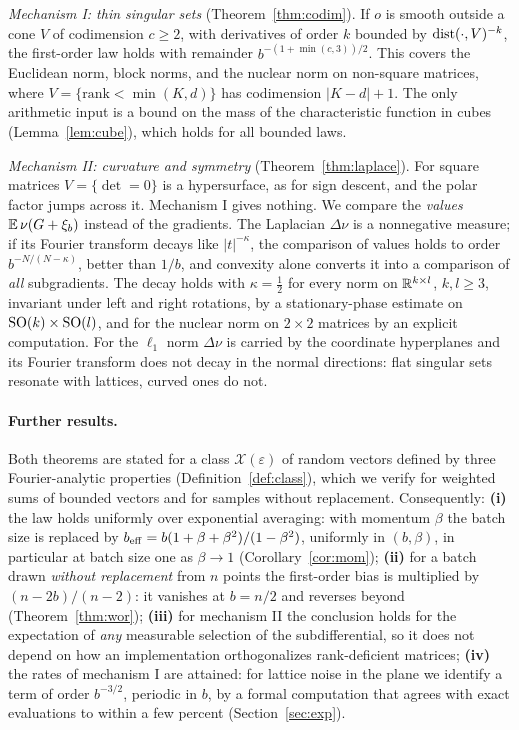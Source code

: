 \documentclass[anon,12pt]{colt2026}
\begin{document}
\emph{Mechanism I: thin singular sets} (Theorem~\ref{thm:codim}). If $o$ is smooth outside a cone $V$ of codimension
$c\ge2$, with derivatives of order $k$ bounded by $\operatorname{dist}(\cdot,V)^{-k}$, the first-order law holds with remainder
$b^{-(1+\min(c,3))/2}$. This covers the Euclidean norm, block norms, and the nuclear norm on non-square matrices, where
$V=\{\text{rank}<\min(K,d)\}$ has codimension $|K-d|+1$. The only arithmetic input is a bound on the mass of the
characteristic function in cubes (Lemma~\ref{lem:cube}), which holds for all bounded laws.

\emph{Mechanism II: curvature and symmetry} (Theorem~\ref{thm:laplace}). For square matrices $V=\{\det=0\}$ is a
hypersurface, as for sign descent, and the polar factor jumps across it. Mechanism I gives nothing. We compare the
\emph{values} $\mathbb{E}\,\nu(G+\xi_b)$ instead of the gradients. The Laplacian $\Delta\nu$ is a nonnegative measure; if its
Fourier transform decays like $|t|^{-\kappa}$, the comparison of values holds to order $b^{-N/(N-\kappa)}$, better than
$1/b$, and convexity alone converts it into a comparison of \emph{all} subgradients. The decay holds with
$\kappa=\frac12$ for every norm on $\mathbb{R}^{k\times l}$, $k,l\ge3$, invariant under left and right rotations, by a
stationary-phase estimate on $\mathrm{SO}(k)\times\mathrm{SO}(l)$, and for the nuclear norm on $2\times2$ matrices by an explicit
computation. For the $\ell_1$ norm $\Delta\nu$ is carried by the coordinate hyperplanes and its Fourier transform does not decay in the
normal directions: flat singular sets resonate with lattices, curved ones do not.

\paragraph{Further results.} Both theorems are stated for a class $\mathcal X(\varepsilon)$ of random vectors defined by
three Fourier-analytic properties (Definition~\ref{def:class}), which we verify for weighted sums of bounded vectors
and for samples without replacement. Consequently:
\textbf{(i)} the law holds uniformly over exponential averaging: with momentum $\beta$ the batch size is replaced by
$b_{\mathrm{eff}}=b(1+\beta+\beta^2)/(1-\beta^2)$, uniformly in $(b,\beta)$, in particular at batch size one as $\beta\to1$
(Corollary~\ref{cor:mom});
\textbf{(ii)} for a batch drawn \emph{without replacement} from $n$ points the first-order bias is multiplied by
$(n-2b)/(n-2)$: it vanishes at $b=n/2$ and reverses beyond (Theorem~\ref{thm:wor});
\textbf{(iii)} for mechanism II the conclusion holds for the expectation of \emph{any} measurable selection of the
subdifferential, so it does not depend on how an implementation orthogonalizes rank-deficient matrices;
\textbf{(iv)} the rates of mechanism I are attained: for lattice noise in the plane we identify a term of order
$b^{-3/2}$, periodic in $b$, by a formal computation that agrees with exact evaluations to within a few percent
(Section~\ref{sec:exp}).
\end{document}
